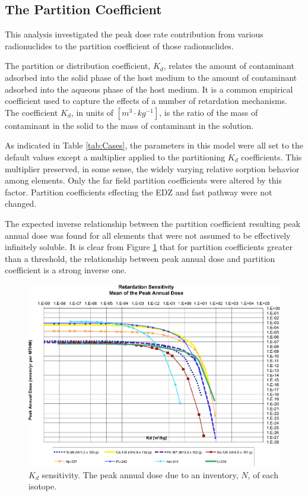 
\subsection{The Partition Coefficient}

This analysis investigated the peak dose rate contribution from various 
radionuclides to the partition coefficient of those radionuclides. 

The partition or distribution coefficient, $K_d$, relates the amount of contaminant adsorbed into the 
solid phase of the host medium to the amount of contaminant adsorbed into the 
aqueous phase of the host medium. It is a common empirical coefficient used to 
capture the effects of a number of retardation mechanisms. The coefficient 
$K_d$, in units of $[m^3\cdot kg^{-1}]$, is the ratio of the mass of contaminant in the 
solid to the mass of contaminant in the solution.

As indicated in Table \ref{tab:Cases}, the parameters in this model were all set 
to the default values except a multiplier applied to the partitioning $K_d$ 
coefficients. This multiplier preserved, in some sense, the widely varying 
relative sorption behavior among elements. Only the far field partition 
coefficients were altered by this factor. Partition coefficients effecting the 
EDZ and fast pathway were not changed.

The expected inverse relationship between the partition coefficient resulting 
peak annual dose was found for all elements that were not assumed to be 
effectively infinitely soluble.  It is clear from Figure \ref{fig:KdSum} that 
for partition coefficients greater than a threshold, the relationship between 
peak annual dose and partition coefficient is a strong inverse one. 

\begin{figure}[ht]
  \centering
  \includegraphics[width=\linewidth]{Partitioning_Summary.eps}
  \caption{$K_d$ sensitivity.  The peak annual dose due to an inventory, 
  $N$, of each isotope.}
  \label{fig:KdSum}
\end{figure}

